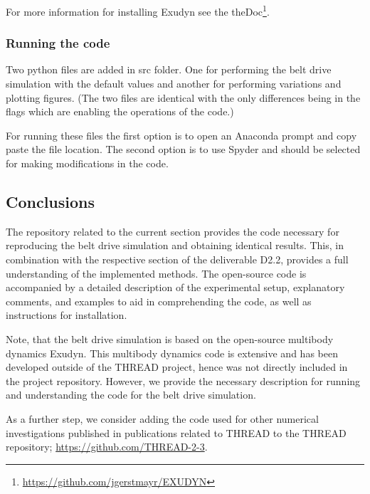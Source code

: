 For more information for installing Exudyn see the theDoc\footnote{\url{https://github.com/jgerstmayr/EXUDYN}}.
\subsubsection{Running the code}
Two python files are added in src folder. One for performing the belt drive simulation with the default values and another for performing variations and plotting figures. (The two files are identical with the only differences being in the flags which are enabling the operations of the code.)
 
For running these files the first option is to open an Anaconda prompt and copy paste the file location.
The second option is to use Spyder and should be selected for making modifications in the code. 

\subsection{Conclusions}
The repository related to the current section provides the code necessary for reproducing the belt drive simulation and obtaining identical results. This, in combination with the respective section of the deliverable D2.2, provides a full understanding of the implemented methods. The open-source code is accompanied by a detailed description of the experimental setup, explanatory comments, and examples to aid in comprehending the code, as well as instructions for installation. 

Note, that the belt drive simulation is based on the open-source multibody dynamics Exudyn. This multibody dynamics code is extensive and has been developed outside of the THREAD project, hence was not directly included in the project repository. However, we provide the necessary description for running and understanding the code for the belt drive simulation.

As a further step, we consider adding the code used for other numerical investigations published in publications related to THREAD to the THREAD repository; \url{https://github.com/THREAD-2-3}.
